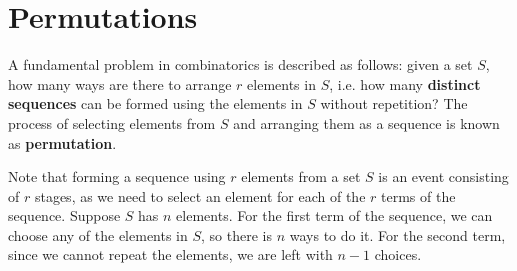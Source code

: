 \documentclass[math]{amznotes}
\theoremstyle{remark}
\newcommand{\0}{\mathbf{0}}
\newcommand{\1}{\mathbf{1}}
\begin{document}
\section{Permutations}
A fundamental problem in combinatorics is described as follows: given a set $S$, how many ways are there to arrange $r$ elements in $S$, i.e. how many \textbf{distinct sequences} can be formed using the elements in $S$ without repetition? The process of selecting elements from $S$ and arranging them as a sequence is known as \textbf{permutation}.

Note that forming a sequence using $r$ elements from a set $S$ is an event consisting of $r$ stages, as we need to select an element for each of the $r$ terms of the sequence. Suppose $S$ has $n$ elements. For the first term of the sequence, we can choose any of the elements in $S$, so there is $n$ ways to do it. For the second term, since we cannot repeat the elements, we are left with $n - 1$ choices. 
\end{document}
